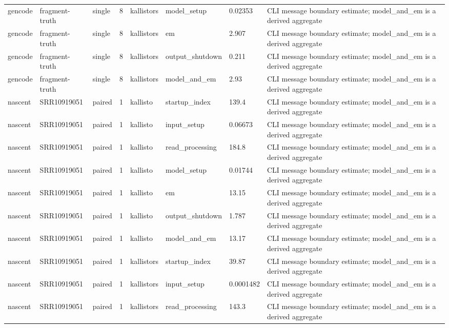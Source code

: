 \begin{tabular}{llllllll}
gencode & fragment-truth & single & 8 & kallistors & model\_setup & 0.02353 & CLI message boundary estimate; model\_and\_em is a derived aggregate \\
gencode & fragment-truth & single & 8 & kallistors & em & 2.907 & CLI message boundary estimate; model\_and\_em is a derived aggregate \\
gencode & fragment-truth & single & 8 & kallistors & output\_shutdown & 0.211 & CLI message boundary estimate; model\_and\_em is a derived aggregate \\
gencode & fragment-truth & single & 8 & kallistors & model\_and\_em & 2.93 & CLI message boundary estimate; model\_and\_em is a derived aggregate \\
nascent & SRR10919051 & paired & 1 & kallisto & startup\_index & 139.4 & CLI message boundary estimate; model\_and\_em is a derived aggregate \\
nascent & SRR10919051 & paired & 1 & kallisto & input\_setup & 0.06673 & CLI message boundary estimate; model\_and\_em is a derived aggregate \\
nascent & SRR10919051 & paired & 1 & kallisto & read\_processing & 184.8 & CLI message boundary estimate; model\_and\_em is a derived aggregate \\
nascent & SRR10919051 & paired & 1 & kallisto & model\_setup & 0.01744 & CLI message boundary estimate; model\_and\_em is a derived aggregate \\
nascent & SRR10919051 & paired & 1 & kallisto & em & 13.15 & CLI message boundary estimate; model\_and\_em is a derived aggregate \\
nascent & SRR10919051 & paired & 1 & kallisto & output\_shutdown & 1.787 & CLI message boundary estimate; model\_and\_em is a derived aggregate \\
nascent & SRR10919051 & paired & 1 & kallisto & model\_and\_em & 13.17 & CLI message boundary estimate; model\_and\_em is a derived aggregate \\
nascent & SRR10919051 & paired & 1 & kallistors & startup\_index & 39.87 & CLI message boundary estimate; model\_and\_em is a derived aggregate \\
nascent & SRR10919051 & paired & 1 & kallistors & input\_setup & 0.0001482 & CLI message boundary estimate; model\_and\_em is a derived aggregate \\
nascent & SRR10919051 & paired & 1 & kallistors & read\_processing & 143.3 & CLI message boundary estimate; model\_and\_em is a derived aggregate \\

\end{tabular}
